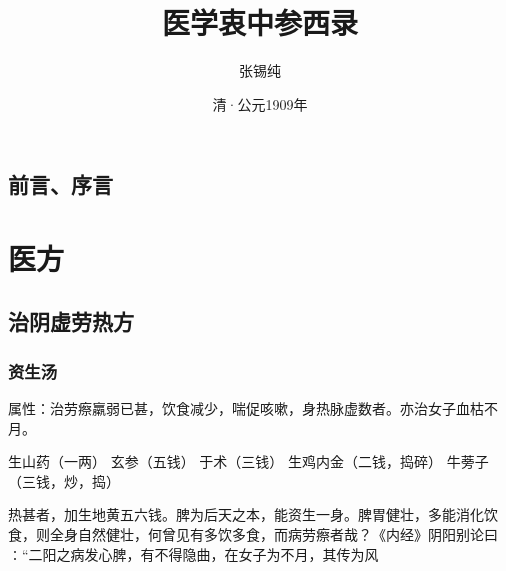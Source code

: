\documentclass[a4paper,12pt,UTF8,twoside]{ctexbook}
\title{\heiti\zihao{0} 医学衷中参西录}
\author{张锡纯}
\date{清·公元1909年 }
\begin{document}
\maketitle
\tableofcontents

\frontmatter
\chapter{前言、序言}






\mainmatter

\part{医方}

\chapter{治阴虚劳热方}

\section{资生汤}
属性：治劳瘵羸弱已甚，饮食减少，喘促咳嗽，身热脉虚数者。亦治女子血枯不月。

生山药（一两） 玄参（五钱） 于术（三钱） 生鸡内金（二钱，捣碎） 牛蒡子（三钱，炒，捣） 

热甚者，加生地黄五六钱。脾为后天之本，能资生一身。脾胃健壮，多能消化饮食，则全身自然健壮，何曾见有多饮多食，而病劳瘵者哉？《内经》阴阳别论曰∶“二阳之病发心脾，有不得隐曲，在女子为不月，其传为风
 
\end{document}
